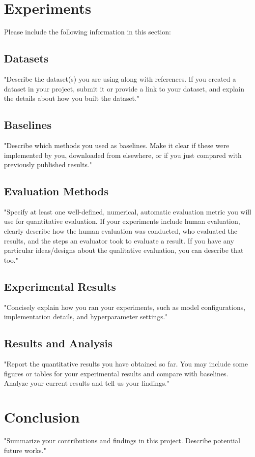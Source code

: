 \documentclass{article} %
\begin{document}
\section{Experiments}
Please include the following information in this section:

\subsection{Datasets}
"Describe the dataset(s) you are using along with references. If you created a dataset in your project, submit it or provide a link to your dataset, and explain the details about how you built
the dataset."

\subsection{Baselines}
"Describe which methods you used as baselines. Make it clear if these were implemented by you, downloaded from elsewhere, or if you just compared with previously published results."

\subsection{Evaluation Methods}
"Specify at least one well-defined, numerical, automatic evaluation metric you will use for quantitative evaluation. If your experiments include human evaluation, clearly describe how the human evaluation was conducted, who evaluated the results, and the steps an evaluator took to evaluate a result. If you have any particular ideas/designs about the qualitative evaluation, you can describe that too."

\subsection{Experimental Results}
"Concisely explain how you ran your experiments, such as model configurations, implementation details, and hyperparameter settings."

\subsection{Results and Analysis}
"Report the quantitative results you have obtained so far. You may include
some figures or tables for your experimental results and compare with baselines. Analyze your current results and tell us your findings."


\section{Conclusion}
"Summarize your contributions and findings in this project. Describe potential future works."
\end{document}
